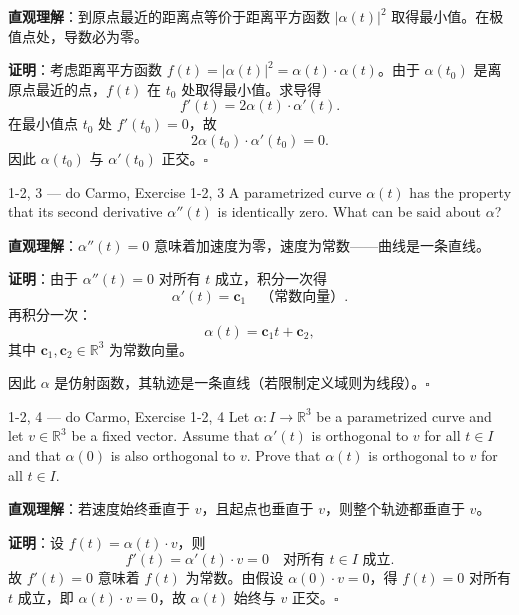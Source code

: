 \begin{solution}
\textbf{直观理解}：到原点最近的距离点等价于距离平方函数 $|\alpha(t)|^2$ 取得最小值。在极值点处，导数必为零。

\textbf{证明}：考虑距离平方函数 $f(t) = |\alpha(t)|^2 = \alpha(t) \cdot \alpha(t)$。由于 $\alpha(t_0)$ 是离原点最近的点，$f(t)$ 在 $t_0$ 处取得最小值。求导得
\[
f'(t) = 2\alpha(t) \cdot \alpha'(t).
\]
在最小值点 $t_0$ 处 $f'(t_0) = 0$，故
\[
2\alpha(t_0) \cdot \alpha'(t_0) = 0.
\]
因此 $\alpha(t_0)$ 与 $\alpha'(t_0)$ 正交。$\square$
\end{solution}

\begin{exercise}{1-2, 3 — do Carmo, Exercise 1-2, 3}
A parametrized curve $\alpha(t)$ has the property that its second derivative $\alpha''(t)$ is identically zero. What can be said about $\alpha$?
\end{exercise}

\begin{solution}
\textbf{直观理解}：$\alpha''(t) = 0$ 意味着加速度为零，速度为常数——曲线是一条直线。

\textbf{证明}：由于 $\alpha''(t) = 0$ 对所有 $t$ 成立，积分一次得
\[
\alpha'(t) = \mathbf{c}_1 \quad \text{（常数向量）}.
\]
再积分一次：
\[
\alpha(t) = \mathbf{c}_1 t + \mathbf{c}_2,
\]
其中 $\mathbf{c}_1, \mathbf{c}_2 \in \mathbb{R}^3$ 为常数向量。

因此 $\alpha$ 是仿射函数，其轨迹是一条直线（若限制定义域则为线段）。$\square$
\end{solution}

\begin{exercise}{1-2, 4 — do Carmo, Exercise 1-2, 4}
Let $\alpha: I \to \mathbb{R}^3$ be a parametrized curve and let $v \in \mathbb{R}^3$ be a fixed vector. Assume that $\alpha'(t)$ is orthogonal to $v$ for all $t \in I$ and that $\alpha(0)$ is also orthogonal to $v$. Prove that $\alpha(t)$ is orthogonal to $v$ for all $t \in I$.
\end{exercise}

\begin{solution}
\textbf{直观理解}：若速度始终垂直于 $v$，且起点也垂直于 $v$，则整个轨迹都垂直于 $v$。

\textbf{证明}：设 $f(t) = \alpha(t) \cdot v$，则
\[
f'(t) = \alpha'(t) \cdot v = 0 \quad \text{对所有 } t \in I \text{ 成立}.
\]
故 $f'(t) = 0$ 意味着 $f(t)$ 为常数。由假设 $\alpha(0) \cdot v = 0$，得 $f(t) = 0$ 对所有 $t$ 成立，即 $\alpha(t) \cdot v = 0$，故 $\alpha(t)$ 始终与 $v$ 正交。$\square$
\end{solution}

